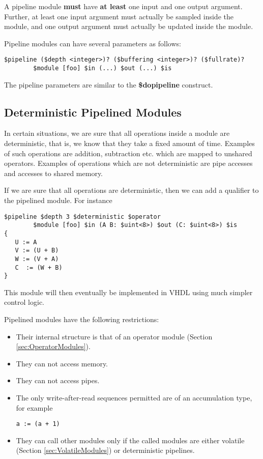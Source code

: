 \documentclass{article}
\begin{document}
A pipeline module {\bf must} have {\bf at least} one input
and one output argument.  Further, at least one input argument
must actually be sampled inside the module, and one output argument
must actually be updated inside the module.

Pipeline modules can have several parameters as follows:
\begin{verbatim}
$pipeline ($depth <integer>)? ($buffering <integer>)? ($fullrate)?
        $module [foo] $in (...) $out (...) $is
\end{verbatim}
The pipeline parameters are similar to the {\bf \$dopipeline} 
construct.

\subsection{Deterministic Pipelined Modules}

In certain situations, we are sure that all operations inside
a module are deterministic, that is, we know that they take
a fixed amount of time.  Examples of such operations are 
addition, subtraction etc. which are mapped to unshared
operators.  Examples of operations which are not deterministic
are pipe accesses and accesses to shared memory.

If we are sure that all operations are deterministic, then
we can add a qualifier to the pipelined module.  For instance
\begin{verbatim}
$pipeline $depth 3 $deterministic $operator
        $module [foo] $in (A B: $uint<8>) $out (C: $uint<8>) $is
{
   U := A
   V := (U + B)
   W := (V + A)
   C  := (W + B)
}
\end{verbatim}
This module will then eventually be implemented in VHDL
using much simpler control logic.

Pipelined modules have the following restrictions:
\begin{itemize}
\item Their internal structure is that of an
operator module (Section \ref{sec:OperatorModules}).
\item They can not access memory.
\item They can not access pipes.
\item The only write-after-read sequences permitted
are of an accumulation type, for example
\begin{verbatim}
a := (a + 1)
\end{verbatim}
\item They can call other modules only if the called
modules are either volatile (Section \ref{sec:VolatileModules}) or deterministic pipelines.
\end{itemize}
\end{document}

